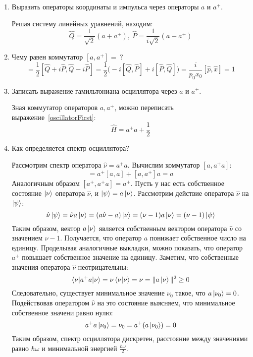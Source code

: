 \documentclass{article}
\begin{document}
\begin{enumerate}
	\item {Выразить операторы координаты и импульса через операторы $a$ и $a^+$.}
	
	Решая систему линейных уравнений, находим:
	\begin{equation}
		\hat{Q} = \frac{1}{\sqrt{2}}(a + a^+), \ \hat{P} = \frac{1}{i\sqrt{2}}(a - a^+)
	\end{equation}
	
	\item {Чему равен коммутатор $[a,a^+] = \ ?$}
	\begin{equation}
		[a,a^+] = \frac{1}{2}[\hat{Q} + i\hat{P}, \hat{Q} - i\hat{P}] = \frac{1}{2}\Big(-i[\hat{Q},\hat{P}] + i[\hat{P},\hat{Q}] \Big) = \frac{i}{p_0 x_0}[\hat{p}, \hat{x}] = 1
	\end{equation}
	
	\item {Записать выражение гамильтониана осциллятора через $a$ и $a^+$.}
	
	Зная коммутатор операторов $a, a^+$, можно переписать выражение~\eqref{oscillatorFirst}:
	\begin{equation}
		\hat{H} = a^+a + \frac{1}{2}
	\end{equation}
	
	\item {Как определяется спектр осциллятора?}
	
	Рассмотрим спектр оператора $\hat{\nu} = a^+a$. Вычислим коммутатор $[a,a^+a]$:
	\begin{equation}
		[a,a^+a] = a^+[a,a] + [a,a^+]a = a
	\end{equation}
	Аналогичным образом $[a^+,a^+a] = a^+$. Пусть у нас есть собственное состояние $\ket{\nu}$ оператора $\hat{\nu}$, и $\ket{\psi} = a\ket{\nu}$. Рассмотрим действие оператора $\hat{\nu}$ на $\ket{\psi}$:
	\begin{equation}
		\hat{\nu}\ket{\psi} = \hat{\nu} a\ket{\nu} = (a\hat{\nu} - a)\ket{\nu} = (\nu - 1)a\ket{\nu} = (\nu - 1)\ket{\psi}
	\end{equation}
	Таким образом, вектор $a\ket{\nu}$ является собственным вектором оператора $\hat{\nu}$ со значением $\nu - 1$. Получается, что оператор $a$ понижает собственное число на единицу. Проделывая аналогичные выкладки, можно показать, что оператор $a^+$ повышает собственное значение на единицу. Заметим, что собственные значения оператора $\hat{\nu}$ неотрицательны:
	\begin{equation}
		\braket{\nu|a^+a|\nu} = \nu\braket{\nu|\nu} = \nu = \| a\ket{\nu}\|^2 \geq 0
	\end{equation}
	Следовательно, существует минимальное значение $\nu_0$ такое, что $a\ket{\nu_0} = 0$. Подействовав оператором $\hat{\nu}$ на это состояние выясняем, что минимальное собственное значени равно нулю:
	\begin{equation}
		a^+a\ket{\nu_0} = \nu_0 = a^+ (a\ket{\nu_0}) = 0
	\end{equation}
	Таким образом, спектр осциллятора дискретен, расстояние между значениями равно $\hbar\omega$ и минимальной энергией $\frac{\hbar\omega}{2}$.
	

\end{enumerate}
\end{document}
